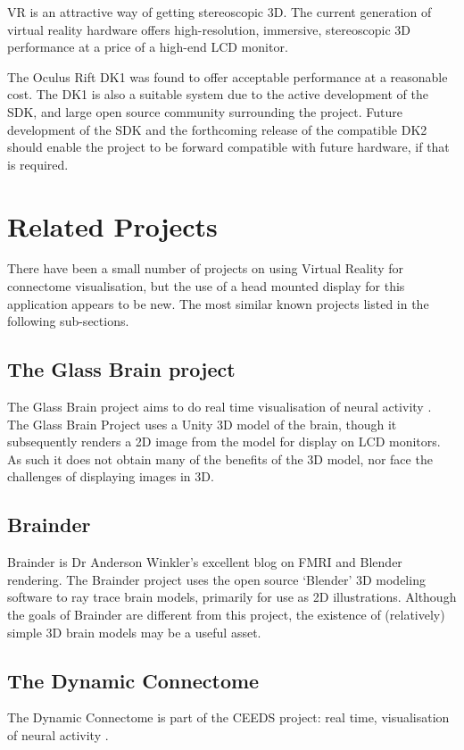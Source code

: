 \documentclass[MSc,paper=a4,pagesize=auto]{icldt}
\begin{document}
VR is an attractive way of getting stereoscopic 3D. The current generation of virtual reality hardware offers high-resolution, immersive, stereoscopic 3D performance at a price of a high-end LCD monitor. 

The Oculus Rift DK1 was found to offer acceptable performance at a reasonable cost. The DK1 is also a suitable system due to the active development of the SDK, and large open source community surrounding the project. Future development of the SDK and the forthcoming release of the compatible DK2 should enable the project to be forward compatible with future hardware, if that is required.


\section{Related Projects}
There have been a small number of projects on using Virtual Reality for connectome visualisation, but the use of a head mounted display for this application appears to be new. The most similar known projects listed in the following sub-sections.

\subsection{The Glass Brain project} 
The Glass Brain project aims to do real time visualisation of neural activity \cite{GlassBrain2014}. The Glass Brain Project uses a Unity 3D model of the brain, though it subsequently renders a 2D image from the model for display on LCD monitors. As such it does not obtain many of the benefits of the 3D model, nor face the challenges of displaying images in 3D.

\subsection{Brainder}
Brainder\cite{brainder2014} is Dr Anderson Winkler’s excellent blog on FMRI and Blender rendering. The Brainder project uses the open source ‘Blender’ 3D modeling software to ray trace brain models, primarily for use as 2D illustrations. Although the goals of Brainder are different from this project, the existence of (relatively) simple 3D brain models may be a useful asset. 

\subsection{The Dynamic Connectome}
The Dynamic Connectome is part of the CEEDS project: real time, visualisation of neural activity \cite{ceeds2014}.
\end{document}
